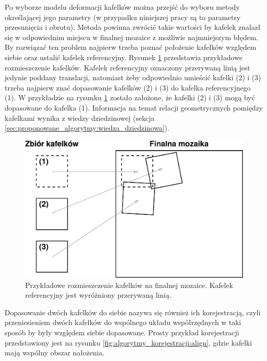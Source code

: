 Po wyborze modelu deformacji kafelków można przejść do wyboru metody określającej jego parametry (w przypadku niniejszej pracy są to parametry przesunięcia i obrotu). Metoda powinna zwrócić takie wartości by kafelek znalazł się w odpowiednim miejscu w finalnej mozaice z możliwie najmniejszym błędem. By rozwiązać ten problem najpierw trzeba poznać położenie kafelków względem siebie oraz ustalić kafelek referencyjny. Rysunek \ref{fig:algorytmy_korejestracji:reference_tile} przedstawia przykładowe rozmieszczenie kafelków. Kafelek referencyjny oznaczony przerywaną linią jest jedynie poddany translacji, natomiast żeby odpowiednio umieścić kafelki (2) i (3) trzeba najpierw znać dopasowanie kafelków (2) i (3) do kafelka referencyjnego (1). W przykładzie na rysunku \ref{fig:algorytmy_korejestracji:reference_tile} zostało założone, że kafelki (2) i (3) mogą być dopasowane do kafelka (1). Informacja na temat relacji geometrycznych pomiędzy kafelkami wynika z wiedzy dziedzinowej (sekcja \ref{sec:proponowane_algorytmy:wiedza_dziedzinowa}).

\begin{figure}[htb]
  \centering
  \includegraphics[width=\textwidth]{gfx/reference_tile}
  \caption{Przykładowe rozmieszczenie kafelków na finalnej mozaice. Kafelek referencyjny jest wyróżniony przerywaną linią.}
  \label{fig:algorytmy_korejestracji:reference_tile}
\end{figure}

Dopasowanie dwóch kafelków do siebie nazywa się również ich korejestracją, czyli przeniesieniem dwóch kafelków do wspólnego układu współrzędnych w taki sposób by były względem siebie dopasowane. Prosty przykład korejestracji przedstawiony jest na rysunku \ref{fig:algorytmy_korejestracji:align}, gdzie kafelki mają wspólny obszar nałożenia.

